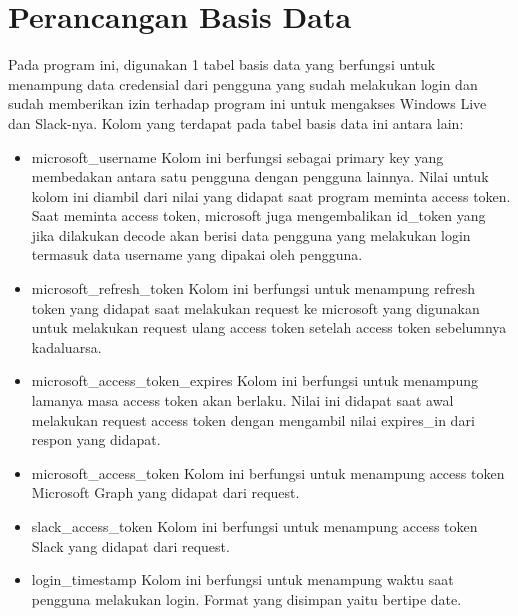 \section{Perancangan Basis Data}
Pada program ini, digunakan 1 tabel basis data yang berfungsi untuk menampung data credensial dari pengguna yang sudah melakukan login dan sudah memberikan izin terhadap program ini untuk mengakses Windows Live dan Slack-nya. Kolom yang terdapat pada tabel basis data ini antara lain:
\begin{itemize}
    \item microsoft\_username
    Kolom ini berfungsi sebagai primary key yang membedakan antara satu pengguna dengan pengguna lainnya. Nilai untuk kolom ini diambil dari nilai yang didapat saat program meminta access token. Saat meminta access token, microsoft juga mengembalikan id\_token yang jika dilakukan decode akan berisi data pengguna yang melakukan login termasuk data username yang dipakai oleh pengguna. 
    \item microsoft\_refresh\_token
    Kolom ini berfungsi untuk menampung refresh token yang didapat saat melakukan request ke microsoft yang digunakan untuk melakukan request ulang access token setelah access token sebelumnya kadaluarsa. 
    \item microsoft\_access\_token\_expires
    Kolom ini berfungsi untuk menampung lamanya masa access token akan berlaku. Nilai ini didapat saat awal melakukan request access token dengan mengambil nilai expires\_in dari respon yang didapat. 
    \item microsoft\_access\_token
    Kolom ini berfungsi untuk menampung access token Microsoft Graph yang didapat dari request. 
    \item slack\_access\_token
    Kolom ini berfungsi untuk menampung access token Slack yang didapat dari request. 
    \item login\_timestamp
    Kolom ini berfungsi untuk menampung waktu saat pengguna melakukan login. Format yang disimpan yaitu bertipe date. 
\end{itemize}

